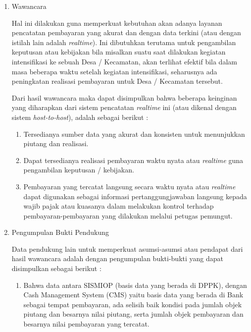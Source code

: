 \documentclass[pdftex,12pt, oneside]{article}
\begin{document}
\begin{enumerate}[1.]
\item Wawancara

Hal ini dilakukan guna memperkuat kebutuhan akan adanya layanan pencatatan pembayaran yang akurat dan dengan data terkini (atau dengan istilah lain adalah \textit{realtime}). Ini dibutuhkan terutama untuk pengambilan keputusan atau kebijakan bila misalkan suatu saat dilakukan kegiatan intensifikasi ke sebuah Desa / Kecamatan, akan terlihat efektif bila dalam masa beberapa waktu setelah kegiatan intensifikasi, seharusnya ada peningkatan realisasi pembayaran untuk Desa / Kecamatan tersebut.

Dari hasil wawancara maka dapat disimpulkan bahwa beberapa keinginan yang diharapkan dari sistem pencatatan \textit{realtime} ini (atau dikenal dengan sistem \textit{host-to-host}), adalah sebagai berikut :

\begin{enumerate}
  \item Tersedianya sumber data yang akurat dan konsisten untuk menunjukkan piutang dan realisasi.
  
  \item Dapat tersedianya realisasi pembayaran waktu nyata atau \textit{realtime} guna pengambilan keputusan / kebijakan.
  
  \item Pembayaran yang tercatat langsung secara waktu nyata atau \textit{realtime} dapat digunakan sebagai informasi pertanggungjawaban langsung kepada wajib pajak atau kuasanya dalam melakukan kontrol terhadap pembayaran-pembayaran yang dilakukan melalui petugas pemungut.
\end{enumerate}

\item Pengumpulan Bukti Pendukung

Data pendukung lain untuk memperkuat asumsi-asumsi atau pendapat dari hasil wawancara adalah dengan pengumpulan bukti-bukti yang dapat disimpulkan sebagai berikut :

\begin{enumerate}

\item Bahwa data antara SISMIOP (basis data yang berada di DPPK), dengan Cash Management System (CMS) yaitu basis data yang berada di Bank sebagai tempat pembayaran, ada selisih baik kondisi pada jumlah objek piutang dan besarnya nilai piutang, serta jumlah objek pembayaran dan besarnya nilai pembayaran yang tercatat.


\end{enumerate}
\end{enumerate}
\end{document}
